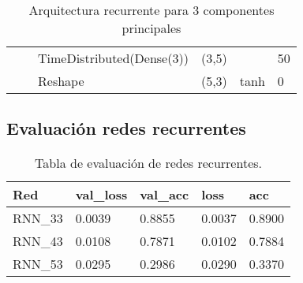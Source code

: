 \begin{table}[H]
\begin{center}
\begin{tabular}{ll|l|l|l|l|}
\multicolumn{1}{|l|}{}                                                                 &                                   & TimeDistributed(Dense(3))          & (3,5)                                &                                          & 50                                           \\ \cline{3-6} 
\multicolumn{1}{|l|}{}                                                                 &                                   & Reshape                            & (5,3)                                & tanh                                     & 0                                           \\ \hline
\end{tabular}

\end{center}
\caption{Arquitectura recurrente para 3 componentes principales}
\label{table:rnn_3}
\end{table}

\subsection{Evaluaci\'{o}n redes recurrentes}

\begin{table}[H]
\centering
\begin{tabular}{|l|l|l|l|l|}
\hline
\textbf{Red} & \textbf{val\_loss} & \textbf{val\_acc} & \textbf{loss} & \textbf{acc} \\ \hline
RNN\_33 & 0.0039 & 0.8855 & 0.0037 & 0.8900 \\ \hline
RNN\_43 & 0.0108 & 0.7871 & 0.0102 & 0.7884 \\ \hline
RNN\_53 & 0.0295 & 0.2986 & 0.0290 & 0.3370 \\ \hline
\end{tabular}
\caption{Tabla de evaluaci\'{o}n de redes recurrentes.}
\label{table:evaluacion_rnn}
\end{table}